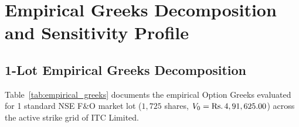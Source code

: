 
\section{Empirical Greeks Decomposition and Sensitivity Profile}
\label{sec:empirical_greeks}

\subsection{1-Lot Empirical Greeks Decomposition}

Table~\ref{tab:empirical_greeks} documents the empirical Option Greeks evaluated for 1 standard NSE F\&O market lot ($1,725$ shares, $V_0 = \text{\text{Rs.}\,}4,91,625.00$) across the active strike grid of ITC Limited.

